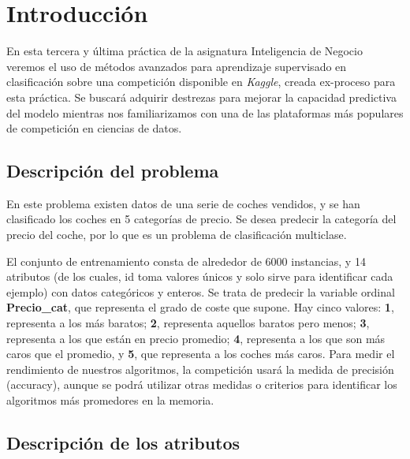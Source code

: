\documentclass[12pt,twoside]{report}
\begin{document}
\begingroup
\pagestyle{plain}
\tableofcontents 
\listoffigures
\listoftables
\endgroup

\clearpage{\pagestyle{empty}\cleardoublepage}
\setcounter{page}{1}
\fancyhead[LE,RO]{\slshape \rightmark}
\fancyhead[LO,RE]{\slshape \leftmark}


\chapter*{Introducción}

En esta tercera y última práctica de la asignatura Inteligencia de Negocio veremos el uso de métodos avanzados para aprendizaje supervisado en clasificación sobre una competición disponible en \textit{Kaggle}, creada ex-proceso para esta práctica. Se buscará adquirir destrezas para mejorar la capacidad predictiva del modelo mientras nos familiarizamos con una de las plataformas más  populares de competición en ciencias de datos.

\section*{Descripción del problema}

En este problema existen datos de una serie de coches vendidos, y se han clasificado los coches en 5 categorías de precio. Se desea predecir la categoría del precio del coche, por lo que es un problema de clasificación multiclase.

El conjunto de entrenamiento consta de alrededor de 6000 instancias, y 14 atributos (de los cuales, id toma valores únicos y solo sirve para identificar cada ejemplo) con datos categóricos y enteros. Se trata de predecir la variable ordinal \textbf{Precio\_cat}, que representa el grado de coste que supone. Hay cinco valores: \textbf{1}, representa a los más baratos; \textbf{2}, representa aquellos baratos pero menos; \textbf{3}, representa a los que están en precio promedio; \textbf{4}, representa a los que son más caros que el promedio, y \textbf{5}, que representa a los coches más caros. Para medir el rendimiento de nuestros algoritmos, la competición usará la medida de precisión (accuracy), aunque se podrá utilizar otras medidas o criterios para identificar los algoritmos más promedores en la memoria.

\section*{Descripción de los atributos}
\end{document}
